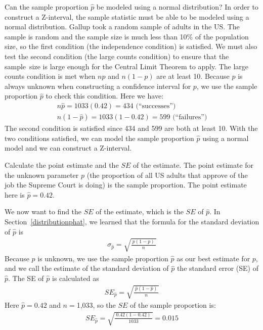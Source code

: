 \begin{examplewrap}
\begin{nexample}{Can the sample proportion $\hat{p}$ be modeled using a normal distribution?}
In order to construct a Z-interval, the sample statistic must be able to be modeled using a normal distribution.  Gallup took a random sample of adults in the US. The sample is random and the sample size is much less than 10\% of the population size, so the first condition (the independence condition) is satisfied.  We must also test the second condition (the large counts condition) to ensure that the sample~size is large enough for the Central Limit Theorem to apply.  The large counts condition is met when $np$ and $n(1-p)$ are at least 10. Because $p$ is always unknown when constructing a confidence interval for $p$, we use the sample proportion $\hat{p}$ to check this condition.  Here we have:
\begin{align*}
n\hat{p} = 1033(0.42) = 434\text{ (``successes'')} \\
 n(1-\hat{p}) = 1033(1 - 0.42) = 599\text{ (``failures'')}
\end{align*}
The second condition is satisfied since 434 and 599 are both at least 10. With the two conditions satisfied, we can model the sample proportion $\hat{p}$ using a normal model and we can construct a Z-interval.
\end{nexample}
\end{examplewrap}


\begin{examplewrap}
\begin{nexample}{Calculate the point estimate and the $SE$ of the estimate.}
\label{supremeCourtCISEExample}
The point estimate for the unknown parameter $p$ (the proportion of all US adults that approve of the job the Supreme Court is doing) is the sample proportion. The point estimate here is $\hat{p} = 0.42$.

We now want to find the $SE$ of the estimate, which is the $SE$ of $\hat{p}$.  
In Section~\ref{distributionphat}, we learned that the formula for the standard deviation of $\hat{p}$ is
\begin{align*}
\sigma_{\hat{p}} = \sqrt{\frac{\ p(1-p)\ }{n}} 
\end{align*}
Because $p$ is unknown, we use the sample proportion $\hat{p}$ as our best estimate for $p$, and we call the estimate of the standard deviation of $\hat{p}$ the standard error (SE) of $\hat{p}$. The SE of $\hat{p}$ is calculated as
\begin{align*}
SE_{\hat{p}} = \sqrt{\frac{\ \hat{p}(1-\hat{p})\ }{n}}
\end{align*}
Here $\hat{p}=0.42$ and $n=$1,033, so the $SE$ of the sample proportion is:
\begin{align*}
SE_{\hat{p}} = \sqrt{\frac{\ 0.42(1-0.42)\ }{1033}}=0.015
\end{align*}
\end{nexample}
\end{examplewrap}

